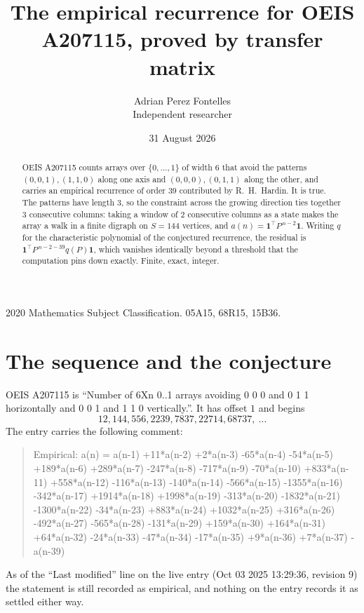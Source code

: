 \documentclass[11pt,a4paper]{article}
\title{The empirical recurrence for OEIS A207115, proved by transfer matrix}
\author{Adrian Perez Fontelles\\ \small Independent researcher}
\date{31 August 2026}
\theoremstyle{plain}
\theoremstyle{definition}
\begin{document}
\maketitle

\begin{abstract}
OEIS A207115 counts arrays over $\{0,\dots,1\}$ of width $6$ that avoid the patterns
$(0,0,1), (1,1,0)$ along one axis and $(0,0,0), (0,1,1)$ along the other, and carries an empirical recurrence of
order $39$ contributed by R.~H.~Hardin. It is true. The patterns have length $3$, so
the constraint across the growing direction ties together $3$ consecutive columns: taking a
window of $2$ consecutive columns as a state makes the array a walk in a finite digraph
on $S=144$ vertices, and $a(n)=\mathbf{1}^{\!\top}P^{\,n-2}\mathbf{1}$. Writing $q$
for the characteristic polynomial of the conjectured recurrence, the residual is
$\mathbf{1}^{\!\top}P^{\,n-2-39}q(P)\mathbf{1}$, which vanishes identically
beyond a threshold that the computation pins down exactly. Finite, exact, integer.
\end{abstract}

\noindent\small 2020 Mathematics Subject Classification. 05A15, 68R15, 15B36.\normalsize

\section{The sequence and the conjecture}

OEIS A207115 is ``Number of 6Xn 0..1 arrays avoiding 0 0 0 and 0 1 1 horizontally and 0 0 1 and 1 1 0 vertically.''. It has offset
$1$ and begins
\[
12, 144, 556, 2239, 7837, 22714, 68737,\ \dots
\]
The entry carries the following comment:
\begin{quote}\small
Empirical: a(n) = a(n-1) +11*a(n-2) +2*a(n-3) -65*a(n-4) -54*a(n-5) +189*a(n-6) +289*a(n-7) -247*a(n-8) -717*a(n-9) -70*a(n-10) +833*a(n-11) +558*a(n-12) -116*a(n-13) -140*a(n-14) -566*a(n-15) -1355*a(n-16) -342*a(n-17) +1914*a(n-18) +1998*a(n-19) -313*a(n-20) -1832*a(n-21) -1300*a(n-22) -34*a(n-23) +883*a(n-24) +1032*a(n-25) +316*a(n-26) -492*a(n-27) -565*a(n-28) -131*a(n-29) +159*a(n-30) +164*a(n-31) +64*a(n-32) -24*a(n-33) -47*a(n-34) -17*a(n-35) +9*a(n-36) +7*a(n-37) -a(n-39)
\end{quote}
As of the ``Last modified'' line on the live entry (Oct 03 2025 13:29:36, revision
9) the statement is still recorded as empirical, and nothing on the entry
records it as settled either way.
\end{document}
